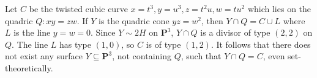 Let $C$ be the twisted cubic curve $x = t^3, y = u^3, z = t^2 u, w = tu^2$ which lies on the quadric $Q: xy = zw$. If $Y$ is the quadric cone $yz = w^2$, then $Y \cap Q = C \cup L$ where $L$ is the line $y = w = 0$. Since $Y \sim 2H$ on $\mathbf{P}^3$, $Y \cap Q$ is a divisor of type $(2,2)$ on $Q$. The line $L$ has type $(1,0)$, so $C$ is of type $(1,2)$. It follows that there does not exist any surface $Y \subseteq \mathbf{P}^3$, not containing $Q$, such that $Y \cap Q = C$, even set-theoretically.
